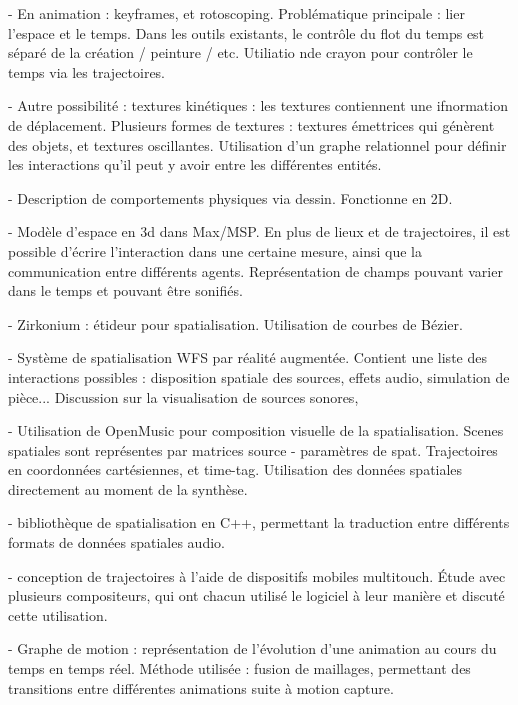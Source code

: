\documentclass[french,12pt]{article}
\begin{document}
- En animation : keyframes, et rotoscoping. Problématique principale : lier l'espace et le temps. Dans les outils existants, le contrôle du flot du temps est séparé de la création / peinture / etc. Utiliatio nde crayon pour contrôler le temps via les trajectoires.
\cite{santosa_direct_2013}

- Autre possibilité : textures kinétiques : les textures contiennent une ifnormation de déplacement. Plusieurs formes de textures : textures émettrices qui génèrent des objets, et textures oscillantes. Utilisation d'un graphe relationnel pour définir les interactions qu'il peut y avoir entre les différentes entités.
\cite{kazi_kitty:_2014}

- Description de comportements physiques via dessin\cite{scott_physink:_2013}. Fonctionne en 2D.

\cite{garcia_jeremie_processing_2015,garcia_towards_2015} %

- Modèle d'espace en 3d dans Max/MSP. En plus de lieux et de trajectoires, il est possible d'écrire l'interaction dans une certaine mesure, ainsi que la communication entre différents agents. Représentation de champs pouvant varier dans le temps et pouvant être sonifiés.
\cite{wakefield_cosm:_2011}

- Zirkonium : étideur pour spatialisation. Utilisation de courbes de Bézier. 
\cite{wagner_introducing_2014}

- Système de spatialisation \ac{WFS} par réalité augmentée. Contient une liste des interactions possibles : disposition spatiale des sources, effets audio, simulation de pièce... Discussion sur la visualisation de sources sonores, 
\cite{melchior_authoring_2005} 

- Utilisation de OpenMusic pour composition visuelle de la spatialisation. Scenes spatiales sont représentes par matrices source - paramètres de spat. Trajectoires en coordonnées cartésiennes, et time-tag. Utilisation des données spatiales directement au moment de la synthèse.
\cite{bresson_spatial_2012}

- bibliothèque de spatialisation en C++, permettant la traduction entre différents formats de données spatiales audio.
\cite{wozniewski_spatosc:_2012}

- conception de trajectoires à l'aide de dispositifs mobiles multitouch. Étude avec plusieurs compositeurs, qui ont chacun utilisé le logiciel à leur manière et discuté cette utilisation.
\cite{favory_trajectoires:_2015}

- Graphe de motion : représentation de l'évolution d'une animation au cours du temps en temps réel. Méthode utilisée : fusion de maillages, permettant des transitions entre différentes animations suite à motion capture. %
\cite{casas_4d_2013}
\end{document}
